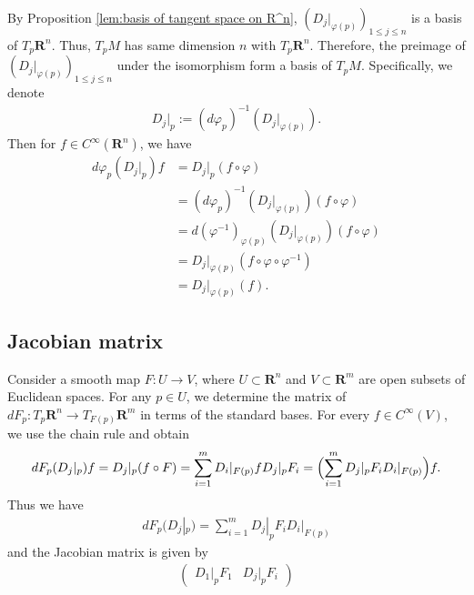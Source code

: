 By Proposition \ref{lem:basis of tangent space on R^n}, $(D_{j}|_{\varphi(p)})_{1 \leq j \leq n}$ is a basis of $T_p\mathbf{R}^n$. Thus, $T_pM$ has same dimension $n$ with $T_p\mathbf{R}^n$. Therefore, the preimage of $(D_{j}|_{\varphi(p)})_{1 \leq j \leq n}$ under the isomorphism form a basis of $T_pM$. Specifically, we denote
    \begin{align*}
        D_{j}|_p := (d\varphi_p)^{-1}(D_{j}|_{\varphi(p)}).
    \end{align*}
Then for $f \in C^\infty(\mathbf{R}^n)$, we have
    \begin{align*}
        d\varphi_{p}(D_{j}|_p)f
        &= D_{j}|_p(f \circ \varphi)\\
        &= (d\varphi_p)^{-1}(D_{j}|_{\varphi(p)})(f \circ \varphi)\\
        &= d(\varphi^{-1})_{\varphi(p)}(D_{j}|_{\varphi(p)})(f \circ \varphi)\\
        &= D_{j}|_{\varphi(p)}(f \circ \varphi \circ \varphi^{-1})\\
        &= D_{j}|_{\varphi(p)}(f).
    \end{align*}

\subsection*{Jacobian matrix}

Consider a smooth map $F : U \to V$, where $U \subset \mathbf{R}^n$ and $V \subset \mathbf{R}^m$ are open subsets of Euclidean spaces. For any $p \in U$, we determine the matrix of $dF_p : T_p\mathbf{R}^n \to T_{F(p)}\mathbf{R}^m$ in terms of the standard bases. For every $f \in C^\infty(V)$, we use the chain rule and obtain
    \begin{align*}
        dF_p(D_j|_p)f
        = D_j|_p(f \circ F)
        = \sum_{i = 1}^{m}D_i|_{F(p)}fD_j|_pF_i
        = \Bigl(\sum_{i = 1}^{m}D_j|_pF_iD_i|_{F(p)}\Bigr)f.
    \end{align*}
Thus we have
    \begin{align*}
        dF_p(D_j|_p) = \sum_{i = 1}^{m}D_j|_pF_iD_i|_{F(p)}
    \end{align*}
and the Jacobian matrix is given by
    \begin{align*}
        \left(\begin{matrix}
            D_1|_pF_1   &D_j|_pF_i
        \end{matrix}\right)
    \end{align*}

